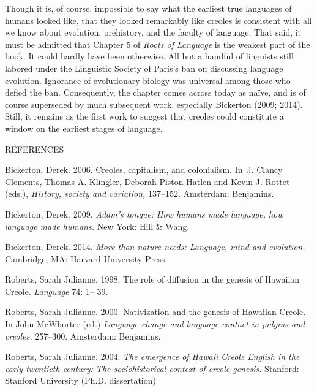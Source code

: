 \documentclass[letterpaper]{article}
\begin{document}
Though it is, of course, impossible to say what the earliest true languages of humans looked like, that they looked remarkably like creoles is consistent with all we know about evolution, prehistory, and the faculty of language. That said, it must be admitted that Chapter 5 of \textit{Roots of Language} is the weakest part of the book.  It could hardly have been otherwise.  All but a handful of linguists still labored under the Linguistic Society of Paris’s ban on discussing language evolution.  Ignorance of evolutionary biology was universal among those who defied the ban.  Consequently, the chapter comes across today as naïve, and is of course superseded by much subsequent work, especially Bickerton (2009; 2014).  Still, it remains as the first work to suggest that creoles could constitute a window on the earliest stages of language.  

 REFERENCES 

Bickerton, Derek.  2006.  Creoles, capitalism, and colonialism. In~J. Clancy Clements, Thomas A. Klingler, Deborah Piston-Hatlen and Kevin J. Rottet (eds.), \textit{History, society and variation, }137–152.\textit{ }Amsterdam: Benjamins. 

Bickerton, Derek.  2009.  \textit{Adam’s tongue: How humans made language, how language made humans.  }New York: Hill \& Wang.

Bickerton, Derek.  2014.  \textit{More than nature needs: Language, mind and evolution. }Cambridge, MA: Harvard University Press.

Roberts, Sarah Julianne.  1998. The role of diffusion in the genesis of Hawaiian Creole. \textit{Language }74: 1– 39.

Roberts, Sarah Julianne.  2000. Nativization and the genesis of Hawaiian Creole. In John McWhorter (ed.) \textit{Language change and language contact in pidgins and creoles,} 257–300. Amsterdam: Benjamins.

Roberts, Sarah Julianne.  2004. \textit{The emergence of Hawaii Creole English in the early twentieth century: The sociohistorical context of creole genesis.} Stanford: Stanford University (Ph.D. dissertation)


\bigskip


\bigskip


\bigskip
\end{document}
